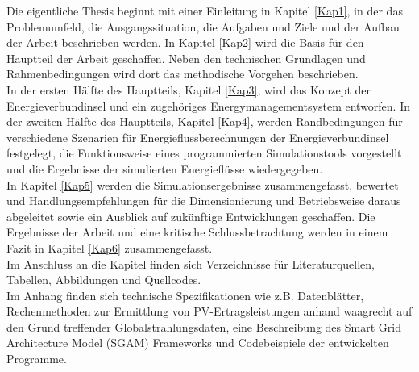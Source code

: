 	Die eigentliche Thesis beginnt mit einer Einleitung in Kapitel \ref{Kap1}, in der das Problemumfeld, die Ausgangssituation, die Aufgaben und Ziele und der Aufbau der Arbeit beschrieben werden. In Kapitel \ref{Kap2} wird die Basis für den Hauptteil der Arbeit geschaffen. Neben den technischen Grundlagen und Rahmenbedingungen wird dort das methodische Vorgehen beschrieben.\\
	
	In der ersten Hälfte des Hauptteils, Kapitel \ref{Kap3}, wird das Konzept der Energieverbundinsel und ein zugehöriges Energymanagementsystem entworfen.	In der zweiten Hälfte des Hauptteils, Kapitel \ref{Kap4}, werden Randbedingungen für verschiedene Szenarien für Energieflussberechnungen der Energieverbundinsel festgelegt, die Funktionsweise eines programmierten Simulationstools vorgestellt und die Ergebnisse der simulierten Energieflüsse wiedergegeben.\\
	
    In Kapitel \ref{Kap5} werden die Simulationsergebnisse zusammengefasst, bewertet und Handlungsempfehlungen für die Dimensionierung und Betriebsweise daraus abgeleitet sowie ein Ausblick auf zukünftige Entwicklungen geschaffen. Die Ergebnisse der Arbeit und eine kritische Schlussbetrachtung werden in einem Fazit in Kapitel \ref{Kap6} zusammengefasst. \\
    
    Im Anschluss an die Kapitel finden sich Verzeichnisse für Literaturquellen, Tabellen, Abbildungen und Quellcodes. \\
	
    Im Anhang finden sich technische Spezifikationen wie z.B. Datenblätter, Rechenmethoden zur Ermittlung von PV-Ertragsleistungen anhand waagrecht auf den Grund treffender Globalstrahlungsdaten, eine Beschreibung des Smart Grid Architecture Model (SGAM) Frameworks und Codebeispiele der entwickelten Programme.
    
    
    